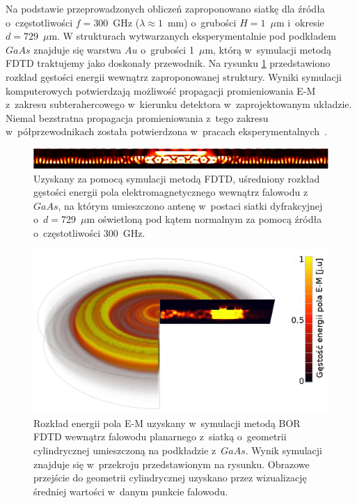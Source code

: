 Na podstawie przeprowadzonych obliczeń zaproponowano siatkę dla źródła o~częstotliwości $f=300$~GHz ($\lambda\approx 1$~mm) o~grubości $H=1$~$\mu$m i~okresie $d=729$~$\mu$m. W strukturach wytwarzanych eksperymentalnie pod podkładem $GaAs$ znajduje się warstwa $Au$ o~grubości 1~$\mu$m, którą w~symulacji metodą FDTD traktujemy jako doskonały przewodnik. Na rysunku \ref{fig:consrc_1d_f300Ghz} przedstawiono rozkład gęstości energii wewnątrz zaproponowanej struktury. Wyniki symulacji komputerowych potwierdzają  możliwość propagacji promieniowania E-M z~zakresu subterahercowego w~kierunku detektora w~zaprojektowanym układzie. Niemal bezstratna propagacja promieniowania z~tego zakresu w~półprzewodnikach została potwierdzona w~pracach eksperymentalnych~\cite{roux2002grating}.

\begin{figure}[tb]
	\includegraphics[width=\textwidth]{images/thz/consrc_siatka1d_300GHz_d729um.png}
	\caption{Uzyskany za pomocą symulacji metodą FDTD, uśredniony rozkład gęstości energii pola elektromagnetycznego wewnątrz falowodu z~$GaAs$, na którym umieszczono antenę w~postaci siatki dyfrakcyjnej o~$d=$729~$\mu$m oświetloną pod kątem normalnym za pomocą źródła o~częstotliwości 300~GHz.  }
	\label{fig:consrc_1d_f300Ghz}
\end{figure}

\begin{figure}[tb]
	\includegraphics[width=\textwidth]{images/antenaThz/tort.png}
	\caption{Rozkład energii pola E-M uzyskany w~symulacji metodą BOR FDTD wewnątrz falowodu planarnego z~siatką o~geometrii cylindrycznej umieszczoną na podkładzie z~$GaAs$. Wynik symulacji znajduje się w~przekroju przedstawionym na rysunku. Obrazowe przejście do geometrii cylindrycznej uzyskano przez wizualizację średniej wartości w~danym punkcie falowodu.}	
	\label{fig:concent_modfalo}
\end{figure}

